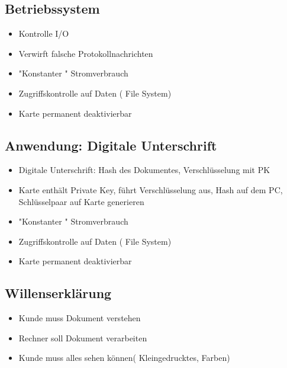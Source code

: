 \subsection*{  Betriebssystem }
\begin{itemize}
	\item Kontrolle I/O
	\item Verwirft falsche Protokollnachrichten
	\item "Konstanter " Stromverbrauch
	\item Zugriffskontrolle auf Daten ( File System)
	\item Karte permanent deaktivierbar 
\end{itemize}

\subsection*{  Anwendung: Digitale Unterschrift }
\begin{itemize}
	\item Digitale Unterschrift: Hash des Dokumentes, Verschlüsselung mit PK
	\item Karte enthält Private Key, führt Verschlüsselung aus, Hash auf dem PC, Schlüsselpaar auf Karte generieren
	\item "Konstanter " Stromverbrauch
	\item Zugriffskontrolle auf Daten ( File System)
	\item Karte permanent deaktivierbar 
\end{itemize}

\subsection*{  Willenserklärung }
\begin{itemize}
	\item Kunde muss Dokument verstehen
	\item Rechner soll Dokument verarbeiten
	\item Kunde muss alles sehen können( Kleingedrucktes, Farben)
\end{itemize}
